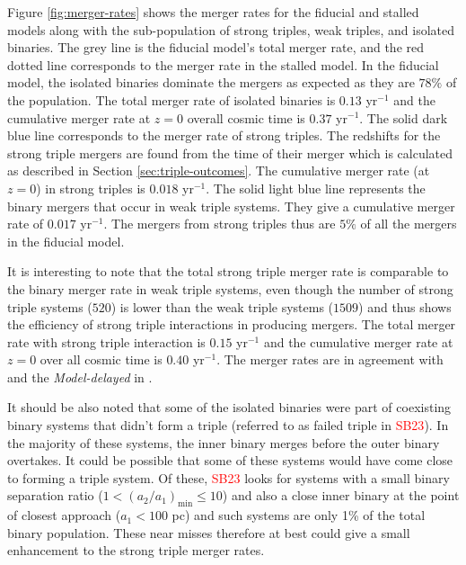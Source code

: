 \documentclass[11pt, letterpaper]{article}
\newcommand{\SB}{\textcolor{red}{SB23}}
\begin{document}
Figure \ref{fig:merger-rates} shows the merger rates for the fiducial and stalled models along with the sub-population of strong triples, weak triples, and isolated binaries. The grey line is the fiducial model's total merger rate, and the red dotted line corresponds to the merger rate in the stalled model. In the fiducial model, the isolated binaries dominate the mergers as expected as they are $78 \%$ of the population. The total merger rate of isolated binaries is $0.13$ yr$^{-1}$ and the cumulative merger rate at $z=0$ overall cosmic time is $0.37$ yr$^{-1}$. The solid dark blue line corresponds to the merger rate of strong triples. The redshifts for the strong triple mergers are found from the time of their merger which is calculated as described in Section \ref{sec:triple-outcomes}. The cumulative merger rate (at $z=0$) in strong triples is  $ 0.018$ yr$^{-1}$. The solid light blue line represents the binary mergers that occur in weak triple systems. They give a cumulative merger rate of $ 0.017$  yr$^{-1}$. The mergers from strong triples thus are $5 \%$ of all the mergers in the fiducial model.

It is interesting to note that the total strong triple merger rate is comparable to the binary merger rate in weak triple systems, even though the number of strong triple systems ($520$) is lower than the weak triple systems ($1509$) and thus shows the efficiency of strong triple interactions in producing mergers. The total merger rate with strong triple interaction is $0.15$ yr$^{-1}$ and the cumulative merger rate at $z=0$ over all cosmic time is $0.40$ yr$^{-1}$. The merger rates are in agreement with \cite{Blecha2016} and the \emph{Model-delayed} in \cite{bonetti_post-newtonian_2019}. 

It should be also noted that some of the isolated binaries were part of coexisting binary systems that didn't form a triple (referred to as failed triple in \SB{}). In the majority of these systems, the inner binary merges before the outer binary overtakes. It could be possible that some of these systems would have come close to forming a triple system. Of these, \SB{} looks for systems with a small binary separation ratio ($1 < (a_2/a_1)_{\text{min}} \leq 10$) and also a close inner binary at the point of closest approach ($a_1 < 100$ pc) and such systems are only 1\% of the total binary population. These near misses therefore at best could give a small enhancement to the strong triple merger rates. 
\end{document}
